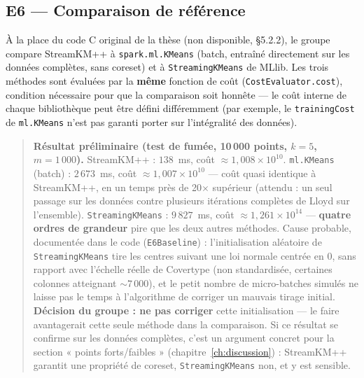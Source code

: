 
\subsection{E6 --- Comparaison de référence}
\label{sec:eval-e6}

À la place du code C original de la thèse (non disponible, §5.2.2), le
groupe compare StreamKM++ à \texttt{spark.ml.KMeans} (batch, entraîné
directement sur les données complètes, sans coreset) et à
\texttt{StreamingKMeans} de MLlib. Les trois méthodes sont évaluées par la
\textbf{même} fonction de coût (\texttt{CostEvaluator.cost}), condition
nécessaire pour que la comparaison soit honnête --- le coût interne de
chaque bibliothèque peut être défini différemment (par exemple, le
\texttt{trainingCost} de \texttt{ml.KMeans} n'est pas garanti porter sur
l'intégralité des données).

\begin{quote}
\textbf{Résultat préliminaire (test de fumée, 10\,000 points, $k=5$,
$m=1\,000$).} StreamKM++ : $138$~ms, coût $\approx 1{,}008\times10^{10}$.
\texttt{ml.KMeans} (batch) : $2\,673$~ms, coût $\approx 1{,}007\times10^{10}$
--- coût quasi identique à StreamKM++, en un temps près de 20$\times$
supérieur (attendu : un seul passage sur les données contre plusieurs
itérations complètes de Lloyd sur l'ensemble). \texttt{StreamingKMeans} :
$9\,827$~ms, coût $\approx 1{,}261\times10^{14}$ --- \textbf{quatre ordres
de grandeur} pire que les deux autres méthodes. Cause probable, documentée
dans le code (\texttt{E6Baseline}) : l'initialisation aléatoire de
\texttt{StreamingKMeans} tire les centres suivant une loi normale centrée en
0, sans rapport avec l'échelle réelle de Covertype (non standardisée,
certaines colonnes atteignant $\sim 7\,000$), et le petit nombre de
micro-batches simulés ne laisse pas le temps à l'algorithme de corriger un
mauvais tirage initial. \textbf{Décision du groupe : ne pas corriger} cette
initialisation --- le faire avantagerait cette seule méthode dans la
comparaison. Si ce résultat se confirme sur les données complètes, c'est un
argument concret pour la section « points forts/faibles »
(chapitre~\ref{ch:discussion}) : StreamKM++ garantit une propriété de
coreset, \texttt{StreamingKMeans} non, et y est sensible.
\end{quote}

